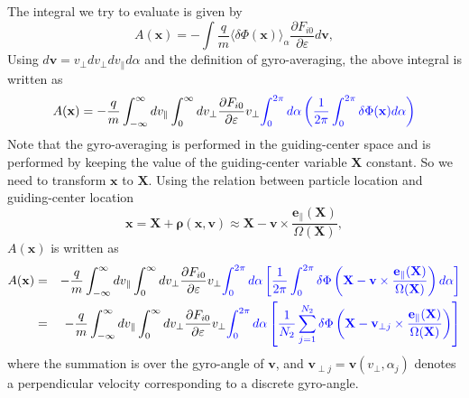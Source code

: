 \documentclass{llncs}
\newcommand{\tmcolor}[2]{{\color{#1}{#2}}}
\newcommand{\tmmathbf}[1]{\ensuremath{\boldsymbol{#1}}}
\begin{document}
The integral we try to evaluate is given by
\begin{equation}
  A (\mathbf{x}) = - \int \frac{q}{m} \langle \delta \Phi (\mathbf{x})
  \rangle_{\alpha} \frac{\partial F_{i 0}}{\partial \varepsilon} d\mathbf{v},
\end{equation}
Using $d \mathbf{v} = v_{\perp} d v_{\perp} d v_{\parallel} d \alpha$ and the
definition of gyro-averaging, the above integral is written as
\begin{equation}
  \label{21-8-22-e1} A (\mathbf{x}) = - \frac{q}{m} \int_{- \infty}^{\infty} d
  v_{\parallel} \int_0^{\infty} d v_{\perp} \frac{\partial F_{i 0}}{\partial
  \varepsilon} v_{\perp} \tmcolor{blue}{\int_0^{2 \pi} d \alpha \left(
  \frac{1}{2 \pi} \int_0^{2 \pi} \delta \Phi (\mathbf{x}) d \alpha \right)}
\end{equation}
Note that the gyro-averaging is performed in the guiding-center space and is
performed by keeping the value of the guiding-center variable $\mathbf{X}$
constant. So we need to transform $\mathbf{x}$ to $\mathbf{X}$. Using the
relation between particle location and guiding-center location
\begin{equation}
  \mathbf{x}=\mathbf{X}+\tmmathbf{\rho} (\mathbf{x}, \mathbf{v}) \approx
  \mathbf{X}-\mathbf{v} \times \frac{\mathbf{e}_{\parallel}
  (\mathbf{X})}{\Omega (\mathbf{X})},
\end{equation}
$A (\mathbf{x})$ is written as
\begin{eqnarray}
  A (\mathbf{x}) & = & - \frac{q}{m} \int_{- \infty}^{\infty} d v_{\parallel}
  \int_0^{\infty} d v_{\perp} \frac{\partial F_{i 0}}{\partial \varepsilon}
  v_{\perp} \tmcolor{blue}{\int_0^{2 \pi} d \alpha \left[ \frac{1}{2 \pi}
  \int_0^{2 \pi} \delta \Phi \left( \mathbf{X}-\mathbf{v} \times
  \frac{\mathbf{e}_{\parallel} (\mathbf{X})}{\Omega (\mathbf{X})} \right) d
  \alpha \right]} \nonumber\\
  & = & - \frac{q}{m} \int_{- \infty}^{\infty} d v_{\parallel}
  \int_0^{\infty} d v_{\perp} \frac{\partial F_{i 0}}{\partial \varepsilon}
  v_{\perp} \tmcolor{blue}{\int_0^{2 \pi} d \alpha \left[ \frac{1}{N_2}
  \sum_{j = 1}^{N_2} \delta \Phi \left( \mathbf{X}-\mathbf{v}_{\perp j} \times
  \frac{\mathbf{e}_{\parallel} (\mathbf{X})}{\Omega (\mathbf{X})} \right)
  \right]} 
\end{eqnarray}
where the summation is over the gyro-angle of $\mathbf{v}$, and
$\mathbf{v}_{\perp j} = \mathbf{v} (v_{\perp}, \alpha_j)$ denotes a
perpendicular velocity corresponding to a discrete gyro-angle.
\end{document}
